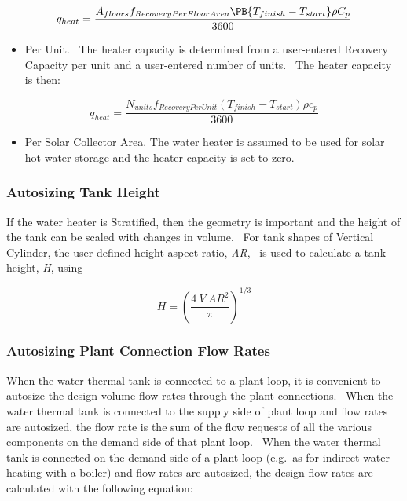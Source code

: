 \begin{equation}
  q_{heat} = \frac{A_{floors}f_{RecoveryPerFloorArea}\PB{T_{finish} - T_{start}}\rho C_p}{3600}
\end{equation}

\begin{itemize}
\item Per Unit.~ The heater capacity is determined from a user-entered Recovery Capacity per unit and a user-entered number of units.~ The heater capacity is then:
\end{itemize}

\begin{equation}
{q_{heat}} = \frac{{{N_{units}}{f_{RecoveryPerUnit}}({T_{finish}} - {T_{start}})\rho {c_p}}}{{3600}}
\end{equation}

\begin{itemize}
\item Per Solar Collector Area. The water heater is assumed to be used for solar hot water storage and the heater capacity is set to zero.
\end{itemize}

\subsubsection{Autosizing Tank Height}\label{autosizing-tank-height}

If the water heater is Stratified, then the geometry is important and the height of the tank can be scaled with changes in volume.~ For tank shapes of Vertical Cylinder, the user defined height aspect ratio, \emph{AR},~ is used to calculate a tank height, \emph{H}, using

\begin{equation}
H = {\left( {\frac{{4~V~A{R^2}}}{\pi }} \right)^{1/3}}
\end{equation}

\subsubsection{Autosizing Plant Connection Flow Rates}\label{autosizing-plant-connection-flow-rates}

When the water thermal tank is connected to a plant loop, it is convenient to autosize the design volume flow rates through the plant connections.~ When the water thermal tank is connected to the supply side of plant loop and flow rates are autosized, the flow rate is the sum of the flow requests of all the various components on the demand side of that plant loop.~ When the water thermal tank is connected on the demand side of a plant loop (e.g.~as for indirect water heating with a boiler) and flow rates are autosized, the design flow rates are calculated with the following equation:

